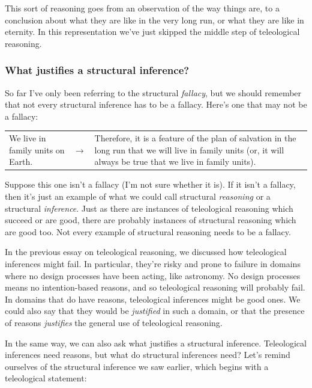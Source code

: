 		This sort of reasoning goes from an observation of the way things are,
			to a conclusion about what they are like in the very long run,
				or what they are like in eternity.
		In this representation we've just skipped the middle step of teleological reasoning.
				
	\subsubsection{What justifies a structural inference?}
	
		So far I've only been referring to the structural \textit{fallacy},
			but we should remember that not every structural inference has to be a fallacy.
		Here's one that may not be a fallacy:
		
		\begin{table}[H]
		\centering
		\begin{tabular}{p{7cm}p{0.5cm}p{7cm}}
		We live in family units on Earth. & $\rightarrow$ & Therefore, it is a feature of the plan of salvation in the long run that we will live in family units (or, it will always be true that we live in family units).
		\end{tabular}
		\end{table}
		
		Suppose this one isn't a fallacy (I'm not sure whether it is).
		If it isn't a fallacy,
			then it's just an example of what we could call structural \textit{reasoning} or a structural \textit{inference}.
		Just as there are instances of teleological reasoning which succeed or are good,
			there are probably instances of structural reasoning which are good too.
		Not every example of structural reasoning needs to be a fallacy.
		
		In the previous essay on teleological reasoning,
			we discussed how teleological inferences might fail.
		In particular,
			they're risky and prone to failure in domains where no design processes have been acting,
				like astronomy.
		No design processes means no intention-based reasons,
			and so teleological reasoning will probably fail.
		In domains that do have reasons,
			teleological inferences might be good ones.
		We could also say that they would be \textit{justified} in such a domain,
			or that the presence of reasons \textit{justifies} the general use of teleological reasoning.
			
		In the same way,
			we can also ask what justifies a structural inference.
		Teleological inferences need reasons,
			but what do structural inferences need?
		Let's remind ourselves of the structural inference we saw earlier,
			which begins with a teleological statement:
			
